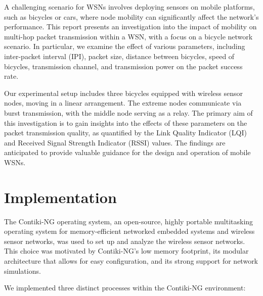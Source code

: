 \documentclass[runningheads]{llncs}
\begin{document}
A challenging scenario for WSNs involves deploying sensors on mobile platforms, such as bicycles or cars, where node mobility can significantly affect the network's performance. This report presents an investigation into the impact of mobility on multi-hop packet transmission within a WSN, with a focus on a bicycle network scenario. In particular, we examine the effect of various parameters, including inter-packet interval (IPI), packet size, distance between bicycles, speed of bicycles, transmission channel, and transmission power on the packet success rate.

Our experimental setup includes three bicycles equipped with wireless sensor nodes, moving in a linear arrangement. The extreme nodes communicate via burst transmission, with the middle node serving as a relay. The primary aim of this investigation is to gain insights into the effects of these parameters on the packet transmission quality, as quantified by the Link Quality Indicator (LQI) and Received Signal Strength Indicator (RSSI) values. The findings are anticipated to provide valuable guidance for the design and operation of mobile WSNs.

\clearpage


\section{Implementation}

The Contiki-NG operating system, an open-source, highly portable multitasking operating system for memory-efficient networked embedded systems and wireless sensor networks, was used to set up and analyze the wireless sensor networks. This choice was motivated by Contiki-NG's low memory footprint, its modular architecture that allows for easy configuration, and its strong support for network simulations.

We implemented three distinct processes within the Contiki-NG environment:
\end{document}
